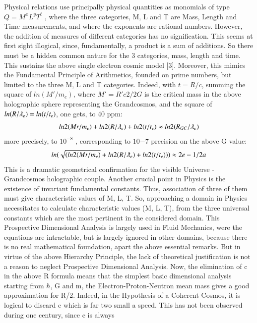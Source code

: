 \documentclass[twoside,draft]{article}
\begin{document}
{Physical relations use principally physical quantities as monomials of type $Q = M^{x} L^{y} T^{t}$ , where
the three categories, M, L and T are Mass, Length and Time measurements, and where the exponents are
rational numbers. However, the addition of measures of different categories has no signification.
This seems at first sight illogical, since, fundamentally, a product is a sum of additions. So there
must be a hidden common nature for the 3 categories, mass, length and time. This sustains the
above single electron cosmic model [3]. Moreover, this mimics the Fundamental Principle of
Arithmetics, founded on prime numbers, but limited to the three M, L and T categories. Indeed, with $t =
R/c$, summing the square of $ln(M\prime/m_{e} )$, where $M\prime = R\prime c 2 /2G$ is the critical mass in the above
holographic sphere representing the Grandcosmos, and the square of $ln(R/\lambdabar_{e} ) = ln(t/t_{e} )$, one gets, to
40 ppm:
\begin{equation}
ln 2 (M\prime/m_{e} ) + ln 2 (R/\lambdabar_{e}) + ln 2 (t/t_{e} ) \approx ln 2 (R_{GC} /\lambdabar_{e} )
\end{equation}
more precisely, to $10^{-8}$ , corresponding to $10{-7}$ precision on the above G value:
\begin{equation}
ln(\sqrt{(ln 2 (M\prime/m_{e} )} + ln 2 (R/\lambdabar_{e} ) + ln 2 (t/t_{e} ))) \approx 2e - 1/2a
\end{equation}
This is a dramatic geometrical confirmation for the visible Universe - Grandcosmos holographic
couple.
Another crucial point in Physics is the existence of invariant fundamental constants. Thus,
association of three of them must give characteristic values of M, L, T. So, approaching a domain in
Physics necessitates to calculate characteristic values (M, L, T), from the three universal constants
which are the most pertinent in the considered domain. This Prospective Dimensional Analysis is
largely used in Fluid Mechanics, were the equations are intractable, but is largely ignored in other
domains, because there is no real mathematical foundation, apart the above essential remarks. But
in virtue of the above Hierarchy Principle, the lack of theoretical justification is not a reason to
neglect Prospective Dimensional Analysis.
Now, the elimination of c in the above R formula means that the simplest basic dimensional
analysis starting from $\hbar$, G and m, the Electron-Proton-Neutron mean mass gives a good
approximation for R/2. Indeed, in the Hypothesis of a Coherent Cosmos, it is logical to discard c
which is far two small a speed. This has not been observed during one century, since c is always
}
\end{document}
